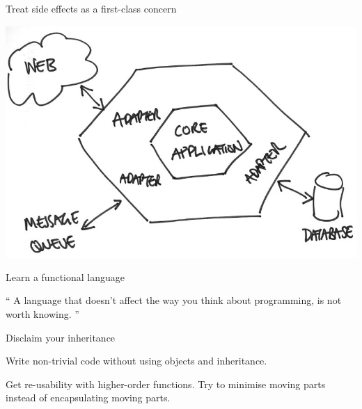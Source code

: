\documentclass[mathserif]{beamer}
\begin{document}
\begin{frame}{Treat side effects as a first-class concern}

  \begin{center}
    \includegraphics[scale=0.3]{img/hexagonal_architecture_sketch.jpg}
  \end{center}

\end{frame}

\begin{frame}{Learn a functional language}

\begin{exampleblock}{}
  {\Large ``
    A language that doesn't affect the way you think about programming, is not worth knowing.
  ''}
  \vskip5mm
  \hspace*{}
\end{exampleblock}

\end{frame}

\begin{frame}{Disclaim your inheritance}

  {\Huge Write non-trivial code without using objects and inheritance.}
  \vskip5mm
  
  {\Large Get \alert{re-usability} with higher-order functions.}
  \vskip2mm
  {\Large Try to \alert{minimise moving parts} instead of encapsulating moving parts.}
  {\small\cite{mfeathers}}

\end{frame}
\end{document}
